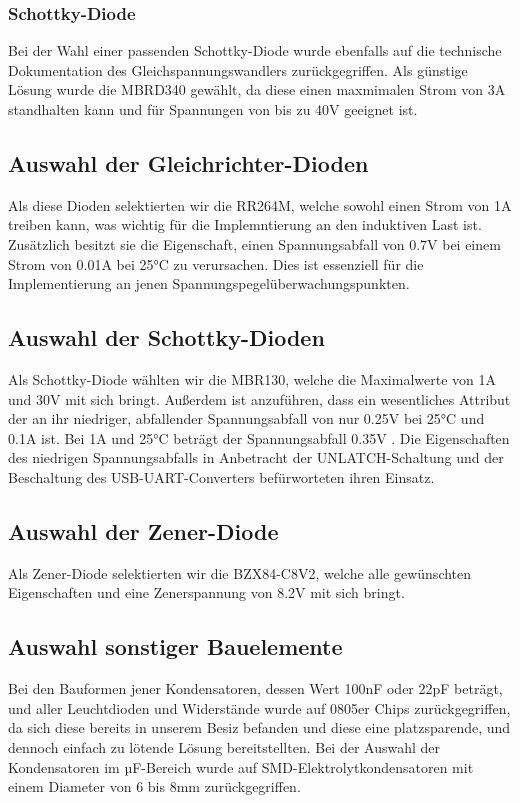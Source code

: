 \subsubsection{Schottky-Diode}
Bei der Wahl einer passenden Schottky-Diode wurde ebenfalls auf die technische Dokumentation des Gleichspannungswandlers zurückgegriffen.
Als günstige Lösung wurde die MBRD340 gewählt, da diese einen maxmimalen Strom von 3A standhalten kann und für Spannungen von bis zu 40V geeignet ist.

\subsection{Auswahl der Gleichrichter-Dioden}

Als diese Dioden selektierten wir die RR264M, welche sowohl einen Strom von 1A treiben kann, was wichtig für die Implemntierung an den induktiven Last ist.
Zusätzlich besitzt sie die Eigenschaft, einen Spannungsabfall von 0.7V bei einem Strom von 0.01A bei 25°C zu verursachen.
Dies ist essenziell für die Implementierung an jenen Spannungspegelüberwachungspunkten.

\subsection{Auswahl der Schottky-Dioden}

Als Schottky-Diode wählten wir die MBR130, welche die Maximalwerte von 1A und 30V mit sich bringt.
Außerdem ist anzuführen, dass ein wesentliches Attribut der an ihr niedriger, abfallender Spannungsabfall von nur 0.25V bei 25°C und 0.1A ist.
Bei 1A und 25°C beträgt der Spannungsabfall 0.35V .
Die Eigenschaften des niedrigen Spannungsabfalls in Anbetracht der UNLATCH-Schaltung und der Beschaltung des USB-UART-Converters befürworteten ihren Einsatz.

\subsection{Auswahl der Zener-Diode}

Als Zener-Diode selektierten wir die BZX84-C8V2, welche alle gewünschten Eigenschaften und eine Zenerspannung von 8.2V mit sich bringt.

\subsection{Auswahl sonstiger Bauelemente}

Bei den Bauformen jener Kondensatoren, dessen Wert 100nF oder 22pF beträgt, und aller Leuchtdioden und Widerstände wurde auf 0805er Chips zurückgegriffen,
da sich diese bereits in unserem Besiz befanden und diese eine platzsparende, und dennoch einfach zu lötende Lösung bereitstellten.
Bei der Auswahl der Kondensatoren im µF-Bereich wurde auf SMD-Elektrolytkondensatoren mit einem Diameter von 6 bis 8mm zurückgegriffen.

